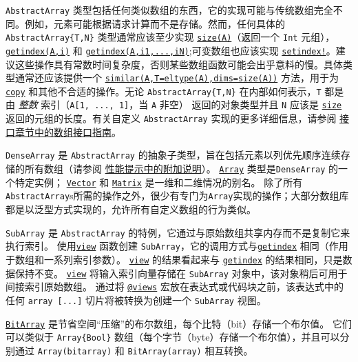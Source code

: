\texttt{AbstractArray} 类型包括任何类似数组的东西，它的实现可能与传统数组完全不同。例如，元素可能根据请求计算而不是存储。然而，任何具体的 \texttt{AbstractArray\{T,N\}} 类型通常应该至少实现 \hyperlink{17888996102305087038}{\texttt{size(A)}}（返回一个 \texttt{Int} 元组），\href{ @ref}{\texttt{getindex(A,i)}} 和 \hyperlink{13720608614876840481}{\texttt{getindex(A,i1,...,iN)}};可变数组也应该实现 \hyperlink{1309244355901386657}{\texttt{setindex!}}。建议这些操作具有常数时间复杂度，否则某些数组函数可能会出乎意料的慢。具体类型通常还应该提供一个 \hyperlink{15525808546723795098}{\texttt{similar(A,T=eltype(A),dims=size(A))}} 方法，用于为 \href{ @ref}{\texttt{copy}} 和其他不合适的操作。无论 \texttt{AbstractArray\{T,N\}} 在内部如何表示，\texttt{T} 都是由 \emph{整数} 索引（\texttt{A[1, ..., 1]}，当 \texttt{A} 非空） 返回的对象类型并且 \texttt{N} 应该是 \hyperlink{17888996102305087038}{\texttt{size}} 返回的元组的长度。有关自定义 \texttt{AbstractArray} 实现的更多详细信息，请参阅 \hyperlink{9718377734213742156}{接口章节中的数组接口指南}。



\texttt{DenseArray} 是 \texttt{AbstractArray} 的抽象子类型，旨在包括元素以列优先顺序连续存储的所有数组（请参阅 \hyperlink{11239800376478112527}{性能提示中的附加说明}）。 \hyperlink{15492651498431872487}{\texttt{Array}} 类型是\texttt{DenseArray} 的一个特定实例； \hyperlink{10571362059486397014}{\texttt{Vector}} 和 \hyperlink{5448927444601277512}{\texttt{Matrix}} 是一维和二维情况的别名。 除了所有\texttt{AbstractArray}s所需的操作之外，很少有专门为\texttt{Array}实现的操作；大部分数组库都是以泛型方式实现的，允许所有自定义数组的行为类似。



\texttt{SubArray} 是 \texttt{AbstractArray} 的特例，它通过与原始数组共享内存而不是复制它来执行索引。 使用\hyperlink{4861450464669906845}{\texttt{view}} 函数创建 \texttt{SubArray}，它的调用方式与\hyperlink{13720608614876840481}{\texttt{getindex}} 相同（作用于数组和一系列索引参数）。 \hyperlink{4861450464669906845}{\texttt{view}} 的结果看起来与 \hyperlink{13720608614876840481}{\texttt{getindex}} 的结果相同，只是数据保持不变。 \hyperlink{4861450464669906845}{\texttt{view}} 将输入索引向量存储在 \texttt{SubArray} 对象中，该对象稍后可用于间接索引原始数组。 通过将  \hyperlink{4544474300423667148}{\texttt{@views}} 宏放在表达式或代码块之前，该表达式中的任何 \texttt{array [...]} 切片将被转换为创建一个 \texttt{SubArray} 视图。



\hyperlink{18015155802543401629}{\texttt{BitArray}} 是节省空间“压缩”的布尔数组，每个比特（bit）存储一个布尔值。 它们可以类似于 \texttt{Array\{Bool\}} 数组（每个字节（byte）存储一个布尔值），并且可以分别通过 \texttt{Array(bitarray)} 和 \texttt{BitArray(array)} 相互转换。



